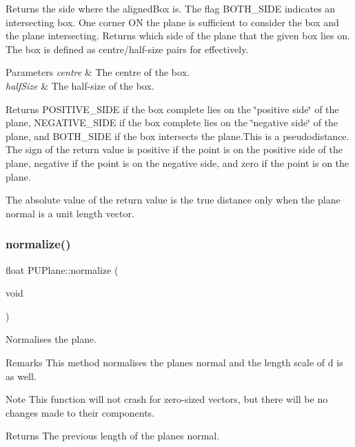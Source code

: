 Returns the side where the aligned\+Box is. The flag B\+O\+T\+H\+\_\+\+S\+I\+DE indicates an intersecting box. One corner ON the plane is sufficient to consider the box and the plane intersecting. Returns which side of the plane that the given box lies on. The box is defined as centre/half-\/size pairs for effectively. 
\begin{DoxyParams}{Parameters}
{\em centre} & The centre of the box. \\
\hline
{\em half\+Size} & The half-\/size of the box. \\
\hline
\end{DoxyParams}
\begin{DoxyReturn}{Returns}
P\+O\+S\+I\+T\+I\+V\+E\+\_\+\+S\+I\+DE if the box complete lies on the \char`\"{}positive side\char`\"{} of the plane, N\+E\+G\+A\+T\+I\+V\+E\+\_\+\+S\+I\+DE if the box complete lies on the \char`\"{}negative side\char`\"{} of the plane, and B\+O\+T\+H\+\_\+\+S\+I\+DE if the box intersects the plane.\+This is a pseudodistance. The sign of the return value is positive if the point is on the positive side of the plane, negative if the point is on the negative side, and zero if the point is on the plane. 
\end{DoxyReturn}
\begin{DoxyParagraph}{}
The absolute value of the return value is the true distance only when the plane normal is a unit length vector. 
\end{DoxyParagraph}
\mbox{\label{classPUPlane_a3fdd7310db1b718bc70fe3cac8714f2e}} 
\subsubsection{\texorpdfstring{normalize()}{normalize()}\hspace{0.1cm}{\footnotesize\ttfamily [1/2]}}
{\footnotesize\ttfamily float P\+U\+Plane\+::normalize (\begin{DoxyParamCaption}\item[{void}]{ }\end{DoxyParamCaption})}

Normalises the plane. \begin{DoxyRemark}{Remarks}
This method normalises the plane\textquotesingle{}s normal and the length scale of d is as well. 
\end{DoxyRemark}
\begin{DoxyNote}{Note}
This function will not crash for zero-\/sized vectors, but there will be no changes made to their components. 
\end{DoxyNote}
\begin{DoxyReturn}{Returns}
The previous length of the plane\textquotesingle{}s normal. 
\end{DoxyReturn}
\mbox{\label{classPUPlane_a3fdd7310db1b718bc70fe3cac8714f2e}} 
